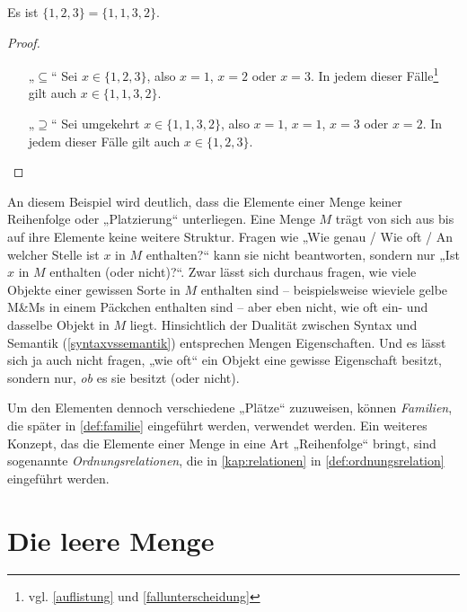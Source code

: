 \begin{bsp}[*] \label{bsp:mengengleichbeweis}
    Es ist $\{1,2,3\}=\{1,1,3,2\}$.
\end{bsp}
\begin{proof}
    \begin{itemize}
        \item[„$\subseteq$“] Sei $x\in\{1,2,3\}$, also $x=1$, $x=2$ oder $x=3$. In jedem dieser Fälle\footnote{vgl. \cref{auflistung} und \cref{fallunterscheidung}} gilt auch $x\in\{1,1,3,2\}$.
        \item[„$\supseteq$“] Sei umgekehrt $x\in\{1,1,3,2\}$,  also $x=1$, $x=1$, $x=3$ oder $x=2$. In jedem dieser Fälle gilt auch $x\in\{1,2,3\}$. \qedhere
    \end{itemize}
\end{proof}


\begin{bem} \label{mengenstrukturlos}
    An diesem Beispiel wird deutlich, dass die Elemente einer Menge keiner Reihenfolge oder „Platzierung“ unterliegen. Eine Menge $M$ trägt von sich aus bis auf ihre Elemente keine weitere Struktur. Fragen wie „Wie genau / Wie oft / An welcher Stelle ist $x$ in $M$ enthalten?“ kann sie nicht beantworten, sondern nur „Ist $x$ in $M$ enthalten (oder nicht)?“. Zwar lässt sich durchaus fragen, wie viele Objekte einer gewissen Sorte in $M$ enthalten sind -- beispielsweise wieviele gelbe M\&Ms in einem Päckchen enthalten sind -- aber eben nicht, wie oft ein- und dasselbe Objekt in $M$ liegt. Hinsichtlich der Dualität zwischen Syntax und Semantik (\cref{syntaxvssemantik}) entsprechen Mengen Eigenschaften. Und es lässt sich ja auch nicht fragen, „wie oft“ ein Objekt eine gewisse Eigenschaft besitzt, sondern nur, \emph{ob} es sie besitzt (oder nicht).
    
    Um den Elementen dennoch verschiedene „Plätze“ zuzuweisen, können \emph{Familien}, die später in \cref{def:familie} eingeführt werden, verwendet werden. Ein weiteres Konzept, das die Elemente einer Menge in eine Art „Reihenfolge“ bringt, sind sogenannte \emph{Ordnungsrelationen}, die in \cref{kap:relationen} in \cref{def:ordnungsrelation} eingeführt werden.
\end{bem}





\section{Die leere Menge}


